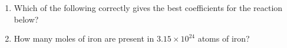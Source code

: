 \documentclass[main.tex]{subfiles}
\begin{document}
\begin{fullwidth}
\begin{multicols*}{2}
\begin{enumerate}
\item Which of the following correctly gives the best coefficients for the reaction below?
	\begin{center}\end{center}
\begin{enumerate}[label=(\alph*)]\vspace{-0.5cm}
\end{enumerate}\vspace{-0.5cm}

\item How many moles of iron are present in $3.15 \times 10^{24}$ atoms of iron?
\begin{enumerate}[label=(\alph*)]\vspace{-0.5cm}
\end{enumerate}\vspace{-0.5cm}




\end{enumerate}
\end{multicols*}
\end{fullwidth}
\end{document}
